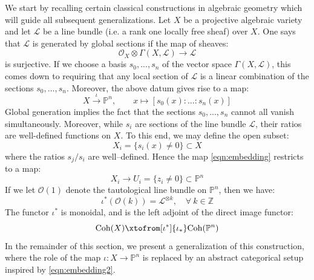 \documentclass[12pt]{amsart}
\numberwithin{equation}{section}
\newtheorem{theorem}{Theorem}[section]
\theoremstyle{definition}
\theoremstyle{remark}
\newcommand{\PP}{\mathbb{P}}
\newcommand{\CL}{\mathcal{L}}
\newcommand{\CO}{\mathcal{O}}
\newcommand{\BZ}{\mathbb{Z}}
\renewcommand{\1}{\mathbf{1}}
\newcommand{\coh}{\mathrm{Coh}}
\begin{document}
We start by recalling certain classical constructions in algebraic geometry which will guide all subsequent generalizations. Let $X$ be a projective algebraic variety and let $\CL$ be a line bundle (i.e. a rank one locally free sheaf) over $X$. One says that $\CL$ is generated by global sections if the map of sheaves:
$$
\CO_X \otimes \Gamma(X, \CL) \rightarrow \CL 
$$
is surjective. If we choose a basis $s_0,...,s_n$ of the vector space $\Gamma(X,\CL)$, this comes down to requiring that any local section of $\CL$ is a linear combination of the sections $s_0,...,s_n$. Moreover, the above datum gives rise to a map:
\begin{equation}
\label{eqn:embedding}
X \stackrel{\iota}\rightarrow \PP^n, \qquad x \mapsto [s_0(x):...:s_n(x)]
\end{equation}
Global generation implies the fact that the sections $s_0,...,s_n$ cannot all vanish simultaneously. Moreover, while $s_i$ are sections of the line bundle $\CL$, their ratios are well-defined functions on $X$. To this end, we may define the open subset: 
$$
X_i =\{s_i(x)\neq 0\} \subset X
$$
where the ratios $s_j/s_i$ are well--defined. Hence the map \eqref{eqn:embedding} restricts to a map:
$$
X_i \rightarrow U_i = \{z_i \neq 0\} \subset \PP^n
$$
If we let $\CO(1)$ denote the tautological line bundle on $\PP^n$, then we have:
$$
\iota^*(\CO(k)) = \CL^{\otimes k}, \quad \forall \ k\in \BZ
$$ 
The functor $\iota^*$ is monoidal, and is the left adjoint of the direct image functor:
\begin{equation}
\label{eqn:embedding2}
\coh(X) \xtofrom[\iota^*]{\iota_*} \coh(\PP^n) 
\end{equation}
In the remainder of this section, we present a generalization of this construction, where the role of the map $\iota:X \rightarrow \PP^n$ is replaced by an abstract categorical setup inspired by \eqref{eqn:embedding2}. 

\end{document}
